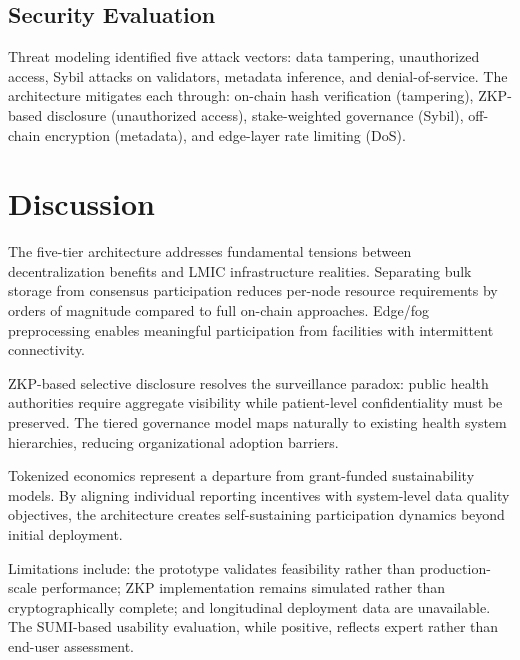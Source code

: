 \documentclass[AMA,LATO1COL]{WileyNJDv5}
\begin{document}
\subsection{Security Evaluation}

Threat modeling identified five attack vectors: data tampering, unauthorized access, Sybil attacks on validators, metadata inference, and denial-of-service. The architecture mitigates each through: on-chain hash verification (tampering), ZKP-based disclosure (unauthorized access), stake-weighted governance (Sybil), off-chain encryption (metadata), and edge-layer rate limiting (DoS).

\section{Discussion}\label{sec:discussion}

The five-tier architecture addresses fundamental tensions between decentralization benefits and LMIC infrastructure realities. Separating bulk storage from consensus participation reduces per-node resource requirements by orders of magnitude compared to full on-chain approaches. Edge/fog preprocessing enables meaningful participation from facilities with intermittent connectivity.

ZKP-based selective disclosure resolves the surveillance paradox: public health authorities require aggregate visibility while patient-level confidentiality must be preserved. The tiered governance model maps naturally to existing health system hierarchies, reducing organizational adoption barriers.

Tokenized economics represent a departure from grant-funded sustainability models. By aligning individual reporting incentives with system-level data quality objectives, the architecture creates self-sustaining participation dynamics beyond initial deployment.

Limitations include: the prototype validates feasibility rather than production-scale performance; ZKP implementation remains simulated rather than cryptographically complete; and longitudinal deployment data are unavailable. The SUMI-based usability evaluation, while positive, reflects expert rather than end-user assessment.

\end{document}
